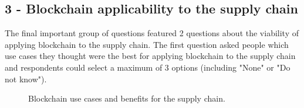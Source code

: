 
\subsection*{3 - Blockchain applicability to the supply chain}
 

The final important group of questions featured 2 questions about the viability of applying blockchain to the supply chain. The first question asked people which use cases they thought were the best for applying blockchain to the supply chain and respondents could select a maximum of 3 options (including "None" or "Do not know").

\begin{figure}[ht]

    
      \caption{Blockchain use cases and benefits for the supply chain.}
    \label{fig:group4_graphics}
\end{figure}

